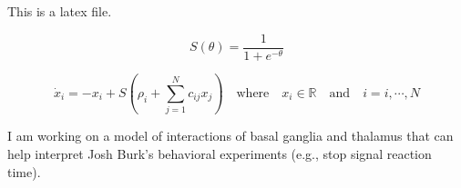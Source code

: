 \documentclass{minimal}
\begin{document}
             


This is a latex file. 

\[
S \left( \theta \right) = \frac{1}{1+e^{-\theta}}
\]

\[
\dot{x}_i = - x_i + S \left( \rho_i + \sum_{j=1}^{N} c_{ij} x_j \right) \quad \mbox{where} \quad x_i \in \mathbb{R} \quad \mbox{and} \quad i = i, \cdots, N
\]

I am working on a model of interactions of basal ganglia and thalamus that can help interpret Josh Burk's behavioral experiments (e.g., stop signal reaction time). 
\end{document}
